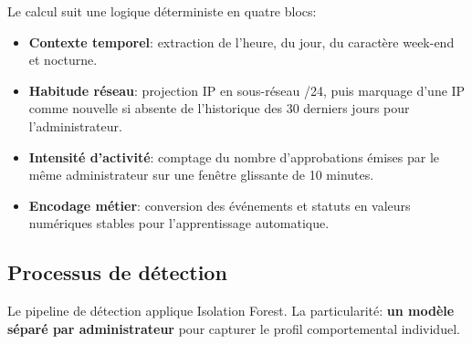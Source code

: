 Le calcul suit une logique déterministe en quatre blocs:
\begin{itemize}
	\item \textbf{Contexte temporel}: extraction de l'heure, du jour, du caractère week-end et nocturne.
	
	\item \textbf{Habitude réseau}: projection IP en sous-réseau /24, puis marquage d'une IP comme nouvelle si absente de l'historique des 30 derniers jours pour l'administrateur.
	
	\item \textbf{Intensité d'activité}: comptage du nombre d'approbations émises par le même administrateur sur une fenêtre glissante de 10 minutes.
	
	\item \textbf{Encodage métier}: conversion des événements et statuts en valeurs numériques stables pour l'apprentissage automatique.
\end{itemize}

\subsection{Processus de détection}

Le pipeline de détection applique Isolation Forest. La particularité: \textbf{un modèle séparé par administrateur} pour capturer le profil comportemental individuel.

